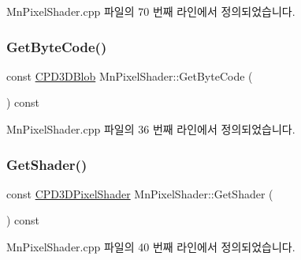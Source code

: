 Mn\+Pixel\+Shader.\+cpp 파일의 70 번째 라인에서 정의되었습니다.

\mbox{\label{class_m_n_l_1_1_mn_pixel_shader_a9d25644c65020454a47baa6bed1f7d3e}} 
\subsubsection{\texorpdfstring{Get\+Byte\+Code()}{GetByteCode()}}
{\footnotesize\ttfamily const \hyperlink{namespace_m_n_l_a3716e3bee60c31fe1b7b5dd5a82db59a}{C\+P\+D3\+D\+Blob} Mn\+Pixel\+Shader\+::\+Get\+Byte\+Code (\begin{DoxyParamCaption}{ }\end{DoxyParamCaption}) const}



Mn\+Pixel\+Shader.\+cpp 파일의 36 번째 라인에서 정의되었습니다.

\mbox{\label{class_m_n_l_1_1_mn_pixel_shader_a7bb94a0a541152261d7cdce85c9983bf}} 
\subsubsection{\texorpdfstring{Get\+Shader()}{GetShader()}}
{\footnotesize\ttfamily const \hyperlink{namespace_m_n_l_a4d6bd408e6e19137a03728583296f12a}{C\+P\+D3\+D\+Pixel\+Shader} Mn\+Pixel\+Shader\+::\+Get\+Shader (\begin{DoxyParamCaption}{ }\end{DoxyParamCaption}) const}



Mn\+Pixel\+Shader.\+cpp 파일의 40 번째 라인에서 정의되었습니다.

\mbox{\label{class_m_n_l_1_1_mn_pixel_shader_aebcf62590c1e66bd7b9211d227087674}} 
